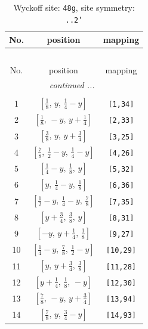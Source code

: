 \documentclass[fleqn,8pt]{jsarticle}
\begin{document}
\begin{longtable}{ccc}
\caption{Wyckoff site: {\tt 48g}, site symmetry: {\tt ..2'}}
 \\
 \hline \hline
No. & position & mapping \\ \hline \endfirsthead

\multicolumn{2}{l}{\tablename\ \thetable{}} \\
 \hline \hline
No. & position & mapping \\ \hline \endhead

 \hline \hline
\multicolumn{2}{r}{\footnotesize\it continued ...} \\ \endfoot

 \hline \hline
\multicolumn{2}{r}{} \\ \endlastfoot

1 & $\left[ \frac{1}{8},\, y,\, \frac{1}{4} - y \right]$ & {\tt [1,34]} \\ \hline
2 & $\left[ \frac{1}{8},\, - y,\, y + \frac{1}{4} \right]$ & {\tt [2,33]} \\ \hline
3 & $\left[ \frac{3}{8},\, y,\, y + \frac{3}{4} \right]$ & {\tt [3,25]} \\ \hline
4 & $\left[ \frac{7}{8},\, \frac{1}{2} - y,\, \frac{1}{4} - y \right]$ & {\tt [4,26]} \\ \hline
5 & $\left[ \frac{1}{4} - y,\, \frac{1}{8},\, y \right]$ & {\tt [5,32]} \\ \hline
6 & $\left[ y,\, \frac{1}{4} - y,\, \frac{1}{8} \right]$ & {\tt [6,36]} \\ \hline
7 & $\left[ \frac{1}{2} - y,\, \frac{1}{4} - y,\, \frac{7}{8} \right]$ & {\tt [7,35]} \\ \hline
8 & $\left[ y + \frac{3}{4},\, \frac{3}{8},\, y \right]$ & {\tt [8,31]} \\ \hline
9 & $\left[ - y,\, y + \frac{1}{4},\, \frac{1}{8} \right]$ & {\tt [9,27]} \\ \hline
10 & $\left[ \frac{1}{4} - y,\, \frac{7}{8},\, \frac{1}{2} - y \right]$ & {\tt [10,29]} \\ \hline
11 & $\left[ y,\, y + \frac{3}{4},\, \frac{3}{8} \right]$ & {\tt [11,28]} \\ \hline
12 & $\left[ y + \frac{1}{4},\, \frac{1}{8},\, - y \right]$ & {\tt [12,30]} \\ \hline
13 & $\left[ \frac{7}{8},\, - y,\, y + \frac{3}{4} \right]$ & {\tt [13,94]} \\ \hline
14 & $\left[ \frac{7}{8},\, y,\, \frac{3}{4} - y \right]$ & {\tt [14,93]} \\ \hline

\end{longtable}
\end{document}

